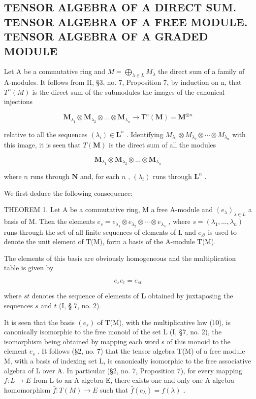 \subsection{TENSOR ALGEBRA OF A DIRECT SUM. TENSOR ALGEBRA OF A FREE MODULE. TENSOR ALGEBRA OF A GRADED MODULE}

Let A be a commutative ring and \(M = \bigoplus_{\lambda \in L} M_{\lambda}\) the direct sum of a family of A-modules. It follows from II, §3, no. 7, Proposition 7, by induction on n, that \(T^{n}(M)\) is the direct sum of the submodules the images of the canonical injections

\[
\mathbf {M} _ {\lambda_ {1}} \otimes \mathbf {M} _ {\lambda_ {2}} \otimes \dots \otimes \mathbf {M} _ {\lambda_ {n}} \rightarrow \mathsf {T} ^ {n} (\mathbf {M}) = \mathbf {M} ^ {\otimes n}
\]

relative to all the sequences \((\lambda_{i})\in\mathbf{L}^{n}\) . Identifying \(M_{\lambda_{1}}\otimes M_{\lambda_{2}}\otimes\cdots\otimes M_{\lambda_{n}}\) with this image, it is seen that \(T(\mathbf{M})\) is the direct sum of all the modules

\[
\mathbf {M} _ {\lambda_ {1}} \otimes \mathbf {M} _ {\lambda_ {2}} \otimes \dots \otimes \mathbf {M} _ {\lambda_ {n}}
\]

where \(n\) runs through \(\mathbf{N}\) and, for each \(n\) , \((\lambda_t)\) runs through \(\mathbf{L}^n\) .

We first deduce the following consequence:

THEOREM 1. Let A be a commutative ring, M a free A-module and \((e_{\lambda})_{\lambda \in L}\) a basis of M. Then the elements \(e_{s} = e_{\lambda_{1}} \otimes e_{\lambda_{2}} \otimes \cdots \otimes e_{\lambda_{n}}\) , where \(s = (\lambda_{1}, \ldots, \lambda_{n})\) runs through the set of all finite sequences of elements of L and \(e_{\varnothing}\) is used to denote the unit element of T(M), form a basis of the A-module T(M).

The elements of this basis are obviously homogeneous and the multiplication table is given by

\[
e _ {s} e _ {t} = e _ {s t}\tag{10}
\]

where \(st\) denotes the sequence of elements of \(\mathbf{L}\) obtained by juxtaposing the sequences \(s\) and \(t\) (I, § 7, no. 2).

It is seen that the basis \((e_{s})\) of T(M), with the multiplicative law (10), is canonically isomorphic to the free monoid of the set L (I, §7, no. 2), the isomorphism being obtained by mapping each word s of this monoid to the element \(e_{s}\) . It follows (§2, no. 7) that the tensor algebra T(M) of a free module M, with a basis of indexing set L, is canonically isomorphic to the free associative algebra of L over A. In particular (§2, no. 7, Proposition 7), for every mapping \(f: L \to E\) from L to an A-algebra E, there exists one and only one A-algebra homomorphism \(\bar{f}: T(M) \to E\) such that \(\bar{f}(e_{\lambda}) = f(\lambda)\) .


